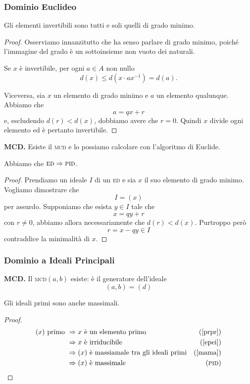 \begin{multicols}{2}
\subsubsection{Dominio Euclideo}

\begin{prop}
	Gli elementi invertibili sono tutti e soli quelli di grado minimo.
\end{prop}
\begin{proof}
	Osserviamo innanzitutto che ha senso parlare di grado minimo, poiché l'immagine del grado è un sottoinsieme non vuoto dei naturali.
	
	Se $ x $ è invertibile, per ogni $ a \in A $ non nullo
	\[ d(x) \leq d(x \cdot ax^{-1}) = d(a). \]
	
	Viceversa, sia $ x $ un elemento di grado minimo e $ a $ un elemento qualunque. Abbiamo che
	\[ a = qx + r \]
	e, escludendo $ d(r) < d(x) $, dobbiamo avere che $ r = 0 $. Quindi $ x $ divide ogni elemento ed è pertanto invertibile. 
\end{proof}


\textbf{MCD.} Esiste il \textsc{mcd} e lo possiamo calcolare con l'algoritmo di Euclide.

	
\begin{prop}\label{abc}
	 Abbiamo che $ \textsc{ed}\Rightarrow\textsc{pid}$.
\end{prop}
\begin{proof}
	Prendiamo un ideale $ I $ di un \textsc{ed} e sia $ x $ il suo elemento di grado minimo. Vogliamo dimostrare che 
	\[ I = (x) \]
	per assurdo. Supponiamo che esista $ y \in I $ tale che
	\[ x = qy + r \]
	con $ r \neq 0 $, abbiamo allora necessariamente che $ d(r) < d(x) $. Purtroppo però
	\[ r = x - qy \in I \]
	contraddice la minimalità di $ x $.
\end{proof}

\subsubsection{Dominio a Ideali Principali}

\textbf{MCD.} Il \textsc{mcd}$ (a, b) $ esiste: è il generatore dell'ideale $$  (a, b) = (d)  $$


\begin{theorem}\label{primossemassimale}
	Gli ideali primi sono anche massimali.
\end{theorem}
\begin{proof}
	\begin{align*}
		(x) \text{ primo } & \Rightarrow x \text{ è un elemento primo} & \text{(\ref{prpr})} \\
		& \Rightarrow x \text{ è irriducibile} &\text{(\ref{epei})} \\
		& \Rightarrow (x) \text{ è massiamale tra gli ideali primi} &\text{(\ref{mama})} \\
		& \Rightarrow (x) \text{ è massimale} &\text{(\textsc{pid})}
	\end{align*}
\end{proof}


\end{multicols}
